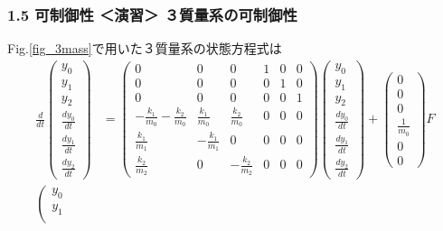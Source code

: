 \begin{frame}[t]
\frametitle{1.5 可制御性 ＜演習＞ ３質量系の可制御性}
Fig.\ref{fig_3mass}で用いた３質量系の状態方程式は
\small{
\begin{align}
 \frac{d}{dt} \left(\begin{array}{c}
           y_0 \\
         y_1 \\
         y_2 \\
         \frac{dy_0}{dt} \\
         \frac{dy_1}{dt} \\
         \frac{dy_2}{dt}
        \end{array}\right)
 &=
 \left(\begin{array}{cccccc}
        0 & 0 & 0 & 1 & 0 & 0      \\
        0 & 0 & 0 & 0 & 1 & 0      \\
        0 & 0 & 0 & 0 & 0 & 1      \\
  -\frac{k_1}{m_0} -\frac{k_2}{m_0}&  \frac{k_1}{m_0} &  \frac{k_2}{m_0} & 0 & 0 & 0 \\
   \frac{k_1}{m_1}                & -\frac{k_1}{m_1} &  0               & 0 & 0 & 0 \\
   \frac{k_2}{m_2}                &  0               & -\frac{k_2}{m_2} & 0 & 0 & 0
       \end{array}\right)
 \left(\begin{array}{c}
           y_0 \\
         y_1 \\
         y_2 \\
         \frac{dy_0}{dt} \\
         \frac{dy_1}{dt} \\
         \frac{dy_2}{dt}
       \end{array}\right)
 +
 \left(\begin{array}{c}
        0 \\
        0 \\
        0 \\
      \frac{1}{m_0} \\
      0 \\
      0
       \end{array}\right)
        F
\nonumber
\\
 \left(\begin{array}{c}
      y_0 \\
    y_1 \\

\end{array}
\end{align}}
\end{frame}
